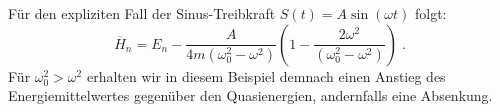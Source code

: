     Für den expliziten Fall der Sinus-Treibkraft $S(t)=A\sin(\omega t)$ folgt:
    \begin{equation}
      \overline{H}_n = E_n - \frac{A}{4m(\omega_0^2-\omega^2)}\left(1-\frac{2\omega^2}{(\omega_0^2-\omega^2)}\right) \; .
      \label{mittleres_H}
    \end{equation}
    Für $\omega_0^2>\omega^2$ erhalten wir in diesem Beispiel demnach einen Anstieg des Energiemittelwertes gegenüber den Quasienergien, andernfalls eine Absenkung.




















